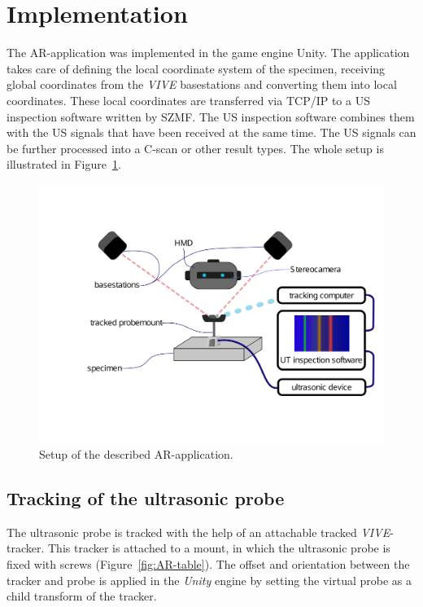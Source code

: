 \documentclass{VRARWorkshop}
\begin{document}
\section{Implementation}
The AR-application was implemented in the game engine Unity.
The application takes care of defining the local coordinate system of the specimen, receiving global coordinates from the \textit{VIVE} basestations and converting them into local coordinates.
These local coordinates are transferred via TCP/IP to a US inspection software written by SZMF.
The US inspection software combines them with the US signals that have been received at the same time.
The US signals can be further processed into a C-scan or other result types.
The whole setup is illustrated in Figure~\ref{fig:Setup}.
\begin{figure}[h!]
    \begin{center}
        \includegraphics[width=158mm]{images/Setup-ARUS}
        \caption{\label{fig:Setup} Setup of the described AR-application.}
    \end{center}
\end{figure}
\subsection{Tracking of the ultrasonic probe}
The ultrasonic probe is tracked with the help of an attachable tracked \textit{VIVE}-tracker.
This tracker is attached to a mount, in which the ultrasonic probe is fixed with screws (Figure~\ref{fig:AR-table}).
The offset and orientation between the tracker and probe is applied in the \textit{Unity} engine by setting the virtual probe as a child transform of the tracker.
\end{document}
